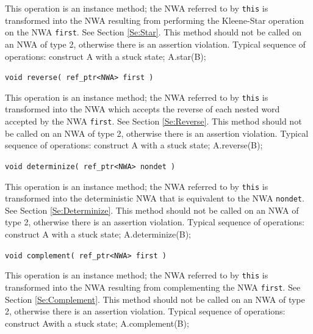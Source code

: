 \documentclass{llncs}
\begin{document}
\begin{description}
    This operation is an instance method; the NWA referred to by
    \texttt{this} is transformed into the NWA resulting from performing the
    Kleene-Star operation on the NWA \texttt{first}.  See Section
    \ref{Se:Star}.  This method should not be called on an NWA of type 2,
    otherwise there is an assertion violation.  Typical sequence of
    operations: construct A with a stuck state; A.star(B);

  \item\texttt{void reverse( ref\_ptr<NWA> first )} \nopagebreak

    This operation is an instance method; the NWA referred to by
    \texttt{this} is transformed into the NWA which accepts the reverse of
    each nested word accepted by the NWA \texttt{first}.  See Section
    \ref{Se:Reverse}.  This method should not be called on an NWA of type 2,
    otherwise there is an assertion violation.  Typical sequence of
    operations: construct A with a stuck state; A.reverse(B);

  \item\texttt{void determinize( ref\_ptr<NWA> nondet )} \nopagebreak

    This operation is an instance method; the NWA referred to by
    \texttt{this} is transformed into the deterministic NWA that is
    equivalent to the NWA \texttt{nondet}.  See Section \ref{Se:Determinize}.
    This method should not be called on an NWA of type 2, otherwise there is
    an assertion violation.  Typical sequence of operations: construct A with
    a stuck state; A.determinize(B);

  \item\texttt{void complement( ref\_ptr<NWA> first )} \nopagebreak

    This operation is an instance method; the NWA referred to by
    \texttt{this} is transformed into the NWA resulting from complementing
    the NWA \texttt{first}.  See Section \ref{Se:Complement}.  This method
    should not be called on an NWA of type 2, otherwise there is an assertion
    violation.  Typical sequence of operations: construct Awith a stuck
    state; A.complement(B);

\end{description}
\end{document}
